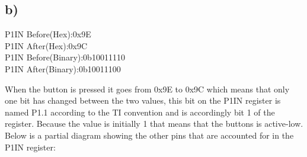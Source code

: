 \documentclass{article}
\begin{document}
\subsection*{b)}
\begin{center}
    \bigbreak
    P1IN Before(Hex):0x9E\\
    P1IN After(Hex):0x9C\\
    P1IN Before(Binary):0b10011110\\
    P1IN After(Binary):0b10011100
\end{center}
\begin{center}
    When the button is pressed it goes from 0x9E to 0x9C which means that only one bit has changed between the two values, this bit on the P1IN register is named P1.1 according to the TI convention and is accordingly bit 1 of the register. Because the value is initially 1 that means that the buttons is active-low. Below is a partial diagram showing the other pins that are accounted for in the P1IN register:
    \bigbreak
\end{center}
\newpage
\end{document}
